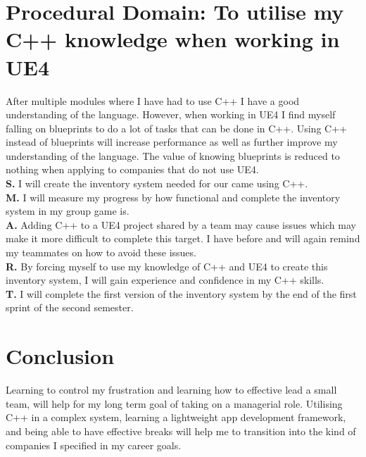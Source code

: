 \documentclass{scrartcl}
\begin{document}
\section{Procedural Domain: To utilise my C++ knowledge when working in UE4}
After multiple modules where I have had to use C++ I have a good understanding of the language.  However, when working in UE4 I find myself falling on blueprints to do a lot of tasks that can be done in C++. Using C++ instead of blueprints will increase performance as well as further improve my understanding of the language. The value of knowing blueprints is reduced to nothing when applying to companies that do not use UE4.\\
\textbf{S.} I will create the inventory system needed for our came using C++. \\
\textbf{M.} I will measure my progress by how functional and complete the inventory system in my group game is.\\
\textbf{A.} Adding C++ to a UE4 project shared by a team may cause issues which may make it more difficult to complete this target. I have before and will again remind my teammates on how to avoid these issues. \\
\textbf{R.}  By forcing myself to use my knowledge of C++ and UE4 to create this inventory system, I will gain experience and confidence in my C++ skills.\\
\textbf{T.}  I will complete the first version of the inventory system by the end of the first sprint of the second semester.\\

\section{Conclusion}
Learning to control my frustration and learning how to effective lead a small team, will help for my long term goal of taking on a managerial role. Utilising C++ in a complex system,  learning a lightweight  app development framework, and being able to have effective breaks will help me to transition into the kind of companies I specified in my career goals.



\end{document}
